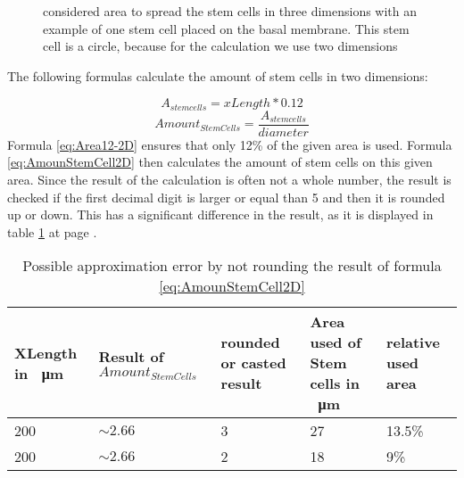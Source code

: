 \begin{figure}[h]
\begin{center}
\caption{considered area to spread the stem cells in three dimensions with an example of one stem cell placed on the basal membrane. This stem cell is a circle, because for the calculation we use two dimensions}
\label{tikz:AreaIn3D}
\end{center}
\end{figure}


The following formulas calculate the amount of stem cells in two dimensions:

\begin{equation}\label{eq:Area12-2D}
A_{stem cells} = xLength * 0.12
\end{equation}
\begin{equation}\label{eq:AmounStemCell2D}
Amount_{StemCells} = \dfrac{A_{stem cells}}{diameter} 
\end{equation}
Formula \ref{eq:Area12-2D} ensures that only 12\% of the given area is used. Formula \ref{eq:AmounStemCell2D} then calculates the amount of stem cells on this given area. Since the result of the calculation is often not a whole number, the result is checked if the first decimal digit is larger or equal than 5 and then it is rounded up or down. This has a significant difference in the result, as it is displayed in table \ref{tbl:Approximation error} at page \pageref{tbl:Approximation error}.
\begin{table}
\centering
\caption{Possible approximation error by not rounding the result of formula \ref{eq:AmounStemCell2D}}
\renewcommand{\arraystretch}{1.5}
	\begin{tabularx}{\textwidth}{XXXXX}
		XLength in \SI{}{\micro\metre} & Result of $Amount_{StemCells}$ & rounded or casted result & Area used of Stem cells in \SI{}{\micro\metre} & relative used area  \\
		\hline
		200 & $\sim 2.66$ & 3 & 27 & 13.5\% \\
		
		200 & $\sim 2.66$ & 2 & 18 & 9\% 

	\end{tabularx}
	\label{tbl:Approximation error}
\end{table}

